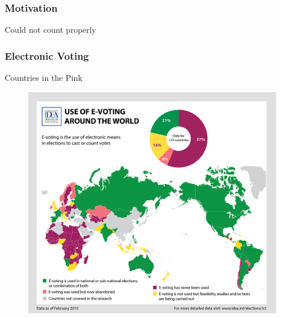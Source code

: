 \documentclass{beamer}
\begin{document}
\begin{frame}
\frametitle{Motivation}
{Could not count properly}
\begin{center}
\end{center}
\end{frame}




\begin{frame}
\frametitle{Electronic Voting}
{Countries in the Pink}
\begin{figure}
\includegraphics[scale=0.20]{e-voting-map.png}
\end{figure}
\end{frame}
\end{document}
